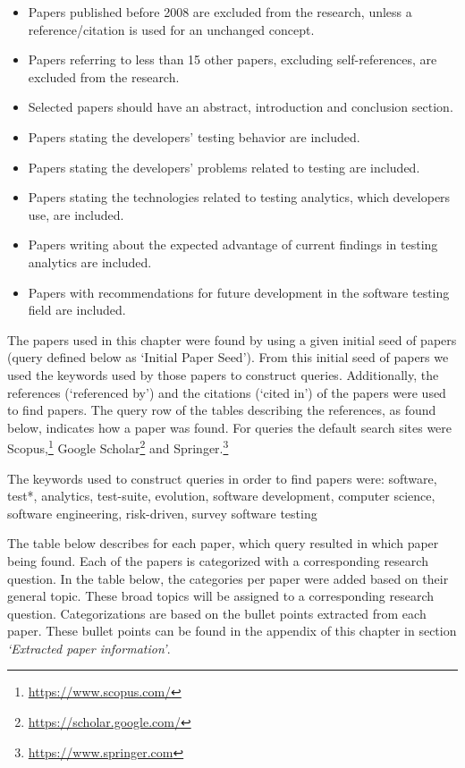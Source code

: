 \documentclass[]{book}
\providecommand{\tightlist}{%
  \setlength{\itemsep}{0pt}\setlength{\parskip}{0pt}}
\let\rmarkdownfootnote\footnote%
\def\footnote{\protect\rmarkdownfootnote}
\begin{document}
\begin{itemize}
\tightlist
\item
  Papers published before 2008 are excluded from the research, unless a
  reference/citation is used for an unchanged concept.
\item
  Papers referring to less than 15 other papers, excluding
  self-references, are excluded from the research.
\item
  Selected papers should have an abstract, introduction and conclusion
  section.
\item
  Papers stating the developers' testing behavior are included.
\item
  Papers stating the developers' problems related to testing are
  included.
\item
  Papers stating the technologies related to testing analytics, which
  developers use, are included.
\item
  Papers writing about the expected advantage of current findings in
  testing analytics are included.
\item
  Papers with recommendations for future development in the software
  testing field are included.
\end{itemize}

The papers used in this chapter were found by using a given initial seed
of papers (query defined below as `Initial Paper Seed'). From this
initial seed of papers we used the keywords used by those papers to
construct queries. Additionally, the references (`referenced by') and
the citations (`cited in') of the papers were used to find papers. The
query row of the tables describing the references, as found below,
indicates how a paper was found. For queries the default search sites
were Scopus,\footnote{\url{https://www.scopus.com/}} Google
Scholar\footnote{\url{https://scholar.google.com/}} and
Springer.\footnote{\url{https://www.springer.com}}

The keywords used to construct queries in order to find papers were:
software, test*, analytics, test-suite, evolution, software development,
computer science, software engineering, risk-driven, survey software
testing

The table below describes for each paper, which query resulted in which
paper being found. Each of the papers is categorized with a
corresponding research question. In the table below, the categories per
paper were added based on their general topic. These broad topics will
be assigned to a corresponding research question. Categorizations are
based on the bullet points extracted from each paper. These bullet
points can be found in the appendix of this chapter in section
\emph{`Extracted paper information'}.
\end{document}
